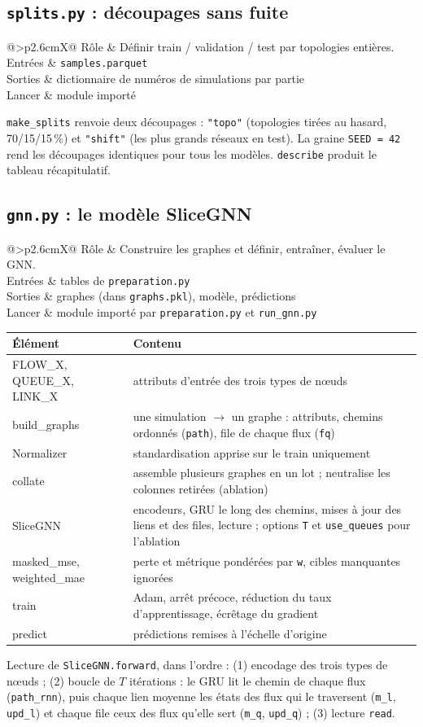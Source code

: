 \documentclass[11pt,a4paper]{article}
\makeatletter
\newcommand{\f}[1]{\texttt{#1}}
\newcommand{\fiche}[4]{%
\noindent\begin{tabularx}{\linewidth}{@{}>{\bfseries}p{2.6cm}X@{}}
\toprule
Rôle & #1\\
Entrées & #2\\
Sorties & #3\\
Lancer & #4\\
\bottomrule
\end{tabularx}\par\medskip}
\makeatother
\begin{document}
\subsection{\texttt{splits.py} : découpages sans fuite}
\fiche{Définir train / validation / test par topologies entières.}
{\f{samples.parquet}}
{dictionnaire de numéros de simulations par partie}
{module importé}
\f{make\_splits} renvoie deux découpages : \f{"topo"} (topologies tirées au hasard, 70/15/15\,\%) et \f{"shift"} (les plus grands réseaux en test). La graine \f{SEED = 42} rend les découpages identiques pour tous les modèles. \f{describe} produit le tableau récapitulatif.

\subsection{\texttt{gnn.py} : le modèle SliceGNN}
\fiche{Construire les graphes et définir, entraîner, évaluer le GNN.}
{tables de \f{preparation.py}}
{graphes (dans \f{graphs.pkl}), modèle, prédictions}
{module importé par \f{preparation.py} et \f{run\_gnn.py}}
\begin{tabularx}{\linewidth}{@{}>{\ttfamily}p{3.6cm}X@{}}
\toprule
\normalfont\bfseries Élément & \bfseries Contenu\\
\midrule
FLOW\_X, QUEUE\_X, LINK\_X & attributs d'entrée des trois types de nœuds\\
build\_graphs & une simulation $\to$ un graphe : attributs, chemins ordonnés (\f{path}), file de chaque flux (\f{fq})\\
Normalizer & standardisation apprise sur le train uniquement\\
collate & assemble plusieurs graphes en un lot ; neutralise les colonnes retirées (ablation)\\
SliceGNN & encodeurs, GRU le long des chemins, mises à jour des liens et des files, lecture ; options \f{T} et \f{use\_queues} pour l'ablation\\
masked\_mse, weighted\_mae & perte et métrique pondérées par \f{w}, cibles manquantes ignorées\\
train & Adam, arrêt précoce, réduction du taux d'apprentissage, écrêtage du gradient\\
predict & prédictions remises à l'échelle d'origine\\
\bottomrule
\end{tabularx}
Lecture de \f{SliceGNN.forward}, dans l'ordre : (1) encodage des trois types de nœuds ; (2) boucle de $T$ itérations : le GRU lit le chemin de chaque flux (\f{path\_rnn}), puis chaque lien moyenne les états des flux qui le traversent (\f{m\_l}, \f{upd\_l}) et chaque file ceux des flux qu'elle sert (\f{m\_q}, \f{upd\_q}) ; (3) lecture \f{read}.
\end{document}
